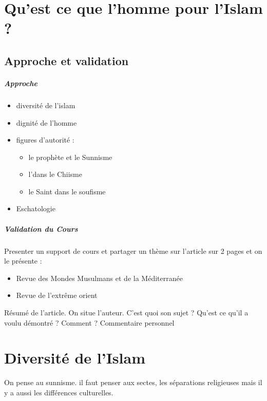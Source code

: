 \chapter{Qu'est ce que l'homme pour l'Islam ?}
\section{Approche et validation}

\paragraph{Approche}
\begin{itemize}
\item diversité de l'islam
\item dignité de l'homme
\item figures d'autorité : 
\begin{itemize}
\item le prophète et le Sunnisme
\item l'\imam dans le Chiisme
\item le Saint dans le soufisme
\end{itemize}
\item Eschatologie
\end{itemize}

\paragraph{Validation du Cours}Presenter un support de cours et partager un thème sur l'article sur 2 pages et on le présente : 
\begin{itemize}
\item Revue des Mondes Musulmans et de la Méditerranée
\item Revue de l'extrême orient
\end{itemize}
Résumé de l'article. On situe l'auteur. C'est quoi son sujet ? Qu'est ce qu'il a voulu démontré ? Comment ? 
Commentaire personnel 


\chapter{Diversité de l'Islam}

On pense au sunnisme. il faut penser aux sectes, les séparations religieuses mais il y a aussi les différences culturelles.
